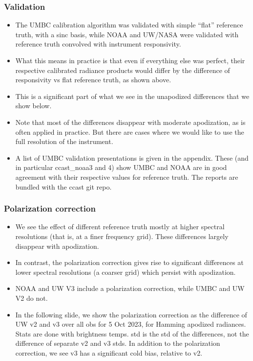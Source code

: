 \documentclass[9pt]{beamer}
\begin{document}
\begin{frame}
\frametitle{Validation}
\begin{itemize}

  \item The UMBC calibration algorithm was validated with simple
    ``flat'' reference truth, with a sinc basis, while NOAA and
    UW/NASA were validated with reference truth convolved with
    instrument responsivity.

  \item What this means in practice is that even if everything else
    was perfect, their respective calibrated radiance products would
    differ by the difference of responsivity vs flat reference
    truth, as shown above.

  \item This is a significant part of what we see in the unapodized
    differences that we show below.

  \item Note that most of the differences disappear with moderate
    apodization, as is often applied in practice.  But there are
    cases where we would like to use the full resolution of the
    instrument.

  \item A list of UMBC validation presentations is given in the
    appendix.  These (and in particular ccast\_noaa3 and 4) show UMBC
    and NOAA are in good agreement with their respective values for
    reference truth.  The reports are bundled with the ccast git
    repo.

\end{itemize}
\end{frame}
\begin{frame}
\frametitle{Polarization correction}
\begin{itemize}

  \item We see the effect of different reference truth mostly at
    higher spectral resolutions (that is, at a finer frequency
    grid).  These differences largely disappear with apodization.

  \item In contrast, the polarization correction gives rise to
    significant differences at lower spectral resolutions (a coarser
    grid) which persist with apodization.

  \item NOAA and UW V3 include a polarization correction, while UMBC
    and UW V2 do not.

  \item In the following slide, we show the polarization correction
    as the difference of UW v2 and v3 over all obs for 5 Oct 2023,
    for Hamming apodized radiances.  Stats are done with brightness
    temps.  std is the std of the differences, not the difference of
    separate v2 and v3 stds.  In addition to the polarization
    correction, we see v3 has a significant cold bias, relative to
    v2.

\end{itemize}
\end{frame}
\end{document}
